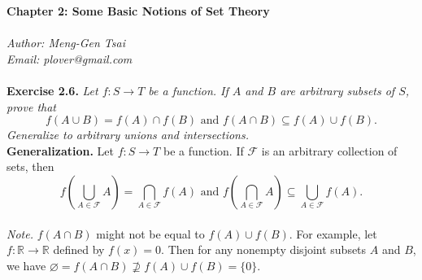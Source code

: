 \documentclass{article}
\begin{document}
\textbf{\Large Chapter 2: Some Basic Notions of Set Theory} \\\\



\emph{Author: Meng-Gen Tsai} \\
\emph{Email: plover@gmail.com} \\\\



\textbf{Exercise 2.6.}
\emph{Let $f: S \rightarrow T$ be a function.
If $A$ and $B$ are arbitrary subsets of $S$, prove that
$$f(A \cup B) = f(A) \cap f(B) \text{ and }
f(A \cap B) \subseteq f(A) \cup f(B).$$
Generalize to arbitrary unions and intersections.} \\

\textbf{Generalization.}
Let $f: S \rightarrow T$ be a function.
If $\mathscr{F}$ is an arbitrary collection of sets, then
$$f\left( \bigcup_{A \in \mathscr{F}} A \right)
= \bigcap_{A \in \mathscr{F}} f(A) \text{ and }
f\left( \bigcap_{A \in \mathscr{F}} A \right)
\subseteq \bigcup_{A \in \mathscr{F}} f(A).$$ \\

\emph{Note.}
$f(A \cap B)$ might not be equal to $f(A) \cup f(B)$.
For example, let $f: \mathbb{R} \rightarrow \mathbb{R}$ defined by $f(x) = 0$.
Then for any nonempty disjoint subsets $A$ and $B$,
we have $\varnothing = f(A \cap B) \not\supseteq f(A) \cup f(B) = \{0\}$. \\
\end{document}
